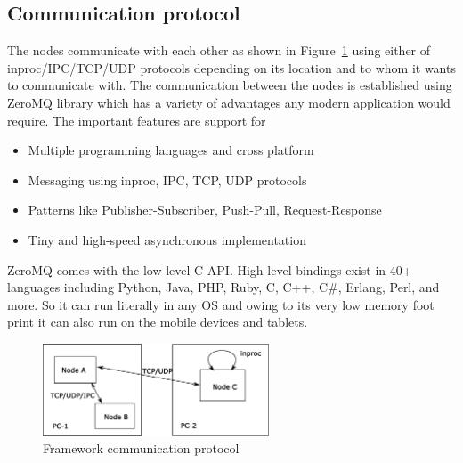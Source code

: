 \subsection{Communication protocol}	
The nodes communicate with each other as shown in Figure~\ref{fig:framework} using either of inproc/IPC/TCP/UDP protocols depending on its location and to whom it wants to communicate with. The communication between the nodes is established using ZeroMQ \cite{ZeroMQ} library which has a variety of advantages any modern application would require. The important features are support for
\begin{itemize}[leftmargin={1cm},topsep={0pt},itemsep={0pt},partopsep={0pt},parsep={0pt}] 
\item Multiple programming languages and cross platform
\item Messaging using inproc, IPC, TCP, UDP protocols
\item Patterns like Publisher-Subscriber, Push-Pull, Request-Response
\item Tiny and high-speed asynchronous implementation
\end{itemize}
ZeroMQ comes with the low-level C API. High-level bindings exist in 40+ languages including Python, Java, PHP, Ruby, C, C++, C\#, Erlang, Perl, and more. So it can run literally in any OS and owing to its very low memory foot print it can also run on the mobile devices and tablets.
\begin{figure}[H]
\centering
\includegraphics[width=0.6\textwidth]{assets/architecture_comm.eps}
\caption[Framework communication protocol]{Framework communication protocol}
\label{fig:framework}
\end{figure}
